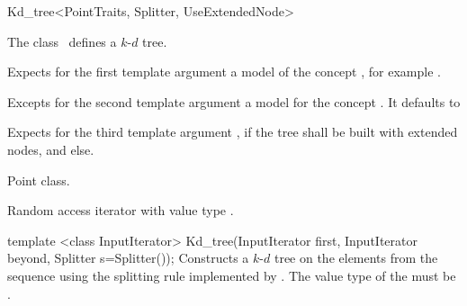 

\begin{ccRefClass}{Kd_tree<PointTraits, Splitter, UseExtendedNode>}  %


\ccDefinition  
The class \ccRefName\ defines a $k$-$d$ tree.


\ccParameters

Expects for the first template argument a model of the concept
, for example .

Excepts for the second template argument a model for the concept .
It defaults  to 

Expects for the third template argument , if the 
tree shall be built with extended nodes, and  else.

\ccTypes

 {Point class.}


\begin{ccAdvanced}
 {Random access iterator 
with value type .}
\end{ccAdvanced}

\ccCreation
{}

\ccConstructor
{template <class InputIterator> Kd_tree(InputIterator first, InputIterator beyond, Splitter s=Splitter());}
{
Constructs a $k$-$d$ tree on the elements from the sequence 
 using the splitting rule implemented by . 
The value type of the  must be .
}


\end{ccRefClass}
